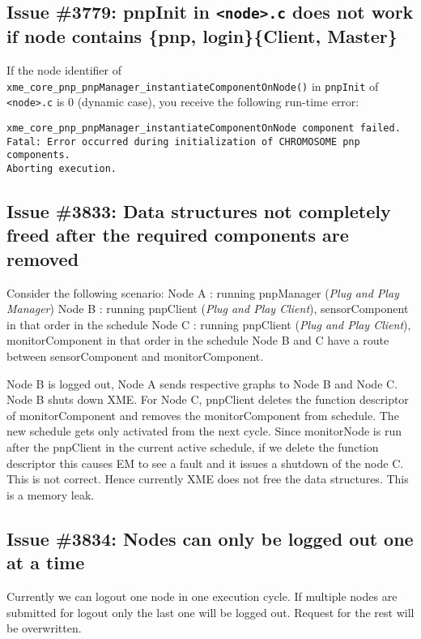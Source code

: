 \subsection{Issue \#3779: pnpInit in \texttt{<node>.c} does not work if node contains \{pnp, login\}\{Client, Master\}}

If the node identifier of \texttt{xme\_core\_pnp\_pnpManager\_instantiateComponentOnNode()} in \texttt{pnpInit} of \texttt{<node>.c} is 0 (dynamic case), you receive the following run-time error:

\begin{verbatim}
xme_core_pnp_pnpManager_instantiateComponentOnNode component failed.
Fatal: Error occurred during initialization of CHROMOSOME pnp components.
Aborting execution.
\end{verbatim}

\subsection{Issue \#3833: Data structures not completely freed after the required components are removed}

Consider the following scenario:
Node A : running pnpManager (\emph{Plug and Play Manager})
Node B : running pnpClient (\emph{Plug and Play Client}), sensorComponent in that order in the schedule
Node C : running pnpClient (\emph{Plug and Play Client}), monitorComponent in that order in the schedule
Node B and C have a route between sensorComponent and monitorComponent.

Node B is logged out, Node A sends respective graphs to Node B and Node C.
Node B shuts down XME.
For Node C, pnpClient deletes the function descriptor of monitorComponent and removes the monitorComponent from schedule. The new schedule gets only activated from the next cycle.
Since monitorNode is run after the pnpClient in the current active schedule, if we delete the function descriptor this causes EM to see a fault and it issues a shutdown of the node C.
This is not correct.
Hence currently XME does not free the data structures. This is a memory leak.

\subsection{Issue \#3834: Nodes can only be logged out one at a time}

Currently we can logout one node in one execution cycle.
If multiple nodes are submitted for logout only the last one will be logged out. Request for the rest will be overwritten.

